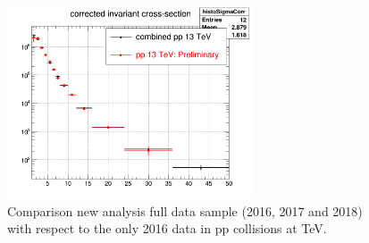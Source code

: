 \begin{figure}[tb]
\begin{center}
\includegraphics[width=0.65\textwidth]{figures/Dstar/pp13TeV/comparison_plt_dstar.png}
\caption{Comparison new analysis full data sample (2016, 2017 and 2018) with respect to the only 2016 data in pp collisions at  TeV.} 
\label{fig:DmesonCorrYieldsCompar}
\end{center}
\end{figure}


